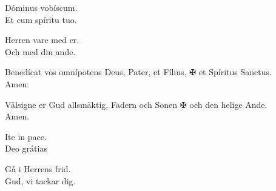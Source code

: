 \smallskip
{}
\smallskip

\begin{multicols}{2}
\renewcommand{\columnseprulecolor}{\color{rubrica}}
\renewcommand{\columnseprule}{0.4pt}
\va Dóminus vobíscum.\\
\ra Et cum spíritu tuo.
\columnbreak

\va Herren vare med er.\\
\ra Och med din ande.
\end{multicols}

\smallskip
{}
\smallskip

\begin{multicols}{2}
\renewcommand{\columnseprulecolor}{\color{rubrica}}
\renewcommand{\columnseprule}{0.4pt}
\va Benedícat vos omnípotens Deus, Pater, et Fílius, {\color{rubrica} $\maltese$} et Spíritus Sanctus.\\
\ra Amen.
\columnbreak

\va Välsigne er Gud allsmäktig, Fadern och Sonen {\color{rubrica} $\maltese$} och den helige Ande.\\
\ra Amen.
\end{multicols}

\smallskip
{}
\smallskip

\begin{multicols}{2}
\renewcommand{\columnseprulecolor}{\color{rubrica}}
\renewcommand{\columnseprule}{0.4pt}
\va Ite in pace.\\
\ra Deo grátias
\columnbreak

\va Gå i Herrens frid.\\
\ra Gud, vi tackar dig.
\end{multicols}



